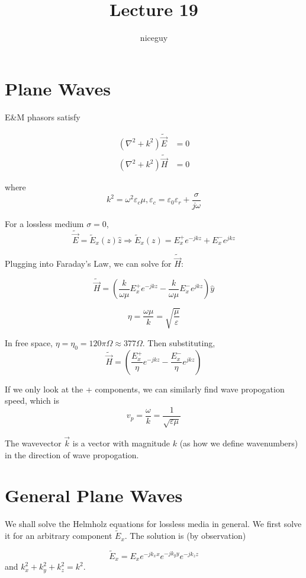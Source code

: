 \documentclass[12pt]{article}
\title{Lecture 19}
\author{niceguy}
\begin{document}
\maketitle

\section{Plane Waves}

E\&M phasors satisfy

\begin{align*}
    (\nabla^2 + k^2)\tilde{\vec E} &= 0 \\
    (\nabla^2 + k^2)\tilde{\vec H} &= 0
\end{align*}

where
$$k^2 = \omega^2\varepsilon_c\mu, \varepsilon_c = \varepsilon_0\varepsilon_r + \frac{\sigma}{j\omega}$$

For a lossless medium $\sigma = 0$, 
$$\tilde{\vec E} = \tilde E_x(z)\hat z \Rightarrow \tilde E_x(z) = E_x^+e^{-jkz} + E_x^-e^{jkz}$$

Plugging into Faraday's Law, we can solve for $\tilde{\vec H}$:

$$\tilde{\vec H} = \left(\frac{k}{\omega\mu}E_x^+e^{-jkz} - \frac{k}{\omega\mu}E_x^-e^{jkz}\right)\hat y$$

\begin{defn}
    $$\eta = \frac{\omega\mu}{k} = \sqrt{\frac{\mu}{\varepsilon}}$$
\end{defn}

In free space, $\eta = \eta_0 = 120\pi\unit{\Omega} \approx 377\unit{\Omega}$. Then substituting,
$$\tilde{\vec H} = \left(\frac{E_x^+}{\eta}e^{-jkz} - \frac{E_x^-}{\eta}e^{jkz}\right)$$

If we only look at the + components, we can similarly find wave propogation speed, which is
$$v_p = \frac{\omega}{k} = \frac{1}{\sqrt{\varepsilon\mu}}$$

\begin{defn}[Wavevector]
    The wavevector $\vec k$ is a vector with magnitude $k$ (as how we define wavenumbers) in the direction of wave propogation.
\end{defn}

\section{General Plane Waves}

We shall solve the Helmholz equations for lossless media in general. We first solve it for an arbitrary component $\tilde E_x$. The solution is (by observation)

$$\tilde E_x = E_x e^{-jk_xx} e^{-jk_yy} e^{-jk_zz}$$
and $k_x^2 + k_y^2 + k_z^2 = k^2$.
\end{document}
